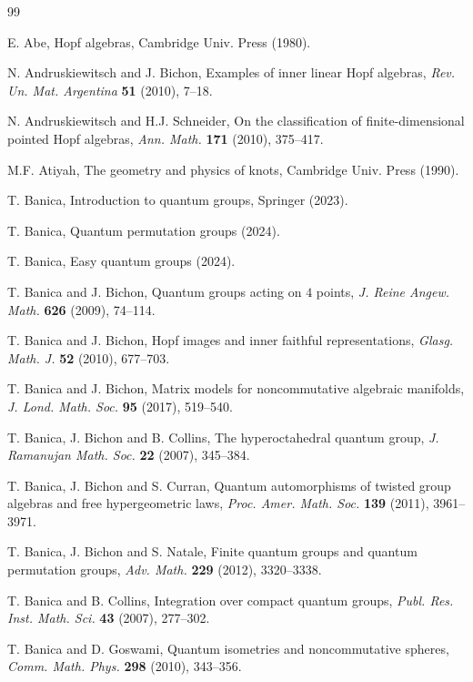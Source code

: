 \documentclass[12pt]{amsbook}
\begin{document}
\begin{thebibliography}{99}

\baselineskip=13.4pt

E. Abe, Hopf algebras, Cambridge Univ. Press (1980).

N. Andruskiewitsch and J. Bichon, Examples of inner linear Hopf algebras, {\em Rev. Un. Mat. Argentina} {\bf 51} (2010), 7--18. 

N. Andruskiewitsch and H.J. Schneider, On the classification of finite-dimensional pointed Hopf algebras, {\em Ann. Math.} {\bf 171} (2010), 375--417.

M.F. Atiyah, The geometry and physics of knots, Cambridge Univ. Press (1990).

T. Banica, Introduction to quantum groups, Springer (2023).

T. Banica, Quantum permutation groups (2024).

T. Banica, Easy quantum groups (2024).

T. Banica and J. Bichon, Quantum groups acting on $4$ points, {\em J. Reine Angew. Math.} {\bf 626} (2009), 74--114.

T. Banica and J. Bichon, Hopf images and inner faithful representations, {\em Glasg. Math. J.} {\bf 52} (2010), 677--703.

T. Banica and J. Bichon, Matrix models for noncommutative algebraic manifolds, {\em J. Lond. Math. Soc.} {\bf 95} (2017), 519--540.

T. Banica, J. Bichon and B. Collins, The hyperoctahedral quantum group, {\em J. Ramanujan Math. Soc.} {\bf 22} (2007), 345--384.

T. Banica, J. Bichon and S. Curran, Quantum automorphisms of twisted group algebras and free hypergeometric laws, {\em Proc. Amer. Math. Soc.} {\bf 139} (2011), 3961--3971.

T. Banica, J. Bichon and S. Natale, Finite quantum groups and quantum permutation groups, {\em Adv. Math.} {\bf 229} (2012), 3320--3338.

T. Banica and B. Collins, Integration over compact quantum groups, {\em Publ. Res. Inst. Math. Sci.} {\bf 43} (2007), 277--302.

T. Banica and D. Goswami, Quantum isometries and noncommutative spheres, {\em Comm. Math. Phys.} {\bf 298} (2010), 343--356.


\end{thebibliography}
\end{document}

